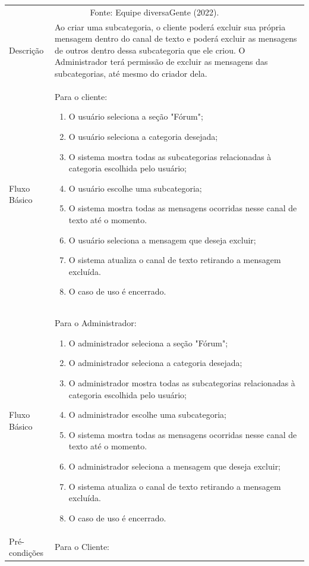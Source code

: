 \begin{landscape}
	\begin{longtable}{|p{3.3cm}|p{10.3cm}|}
		\hline
		\thead{} & \thead{Ator} \\
		\hline
				\endfirsthead
		\multicolumn{2}{c}{\scriptsize Fonte: Equipe diversaGente (2022).}%
		{{\bfseries Quadro \autoref{item}\ continued from previous page}} \\
		\endhead
		Descrição & Ao criar uma subcategoria, o cliente poderá excluir sua própria mensagem dentro do canal de texto e poderá excluir as mensagens de outros dentro dessa subcategoria que ele criou. O Administrador terá permissão de excluir as mensagens das subcategorias, até mesmo do criador dela.\\
		\hline
		Fluxo Básico  & 
		Para o cliente:
		\begin{enumerate}
			\item O usuário seleciona a seção "Fórum";
			\item O usuário seleciona a categoria desejada;
			\item O sistema mostra todas as subcategorias relacionadas à categoria escolhida pelo usuário;
			\item O usuário escolhe uma subcategoria;
			\item O sistema mostra todas as mensagens ocorridas nesse canal de texto até o momento. 
			\item O usuário seleciona a mensagem que deseja excluir;
			\item O sistema atualiza o canal de texto retirando a mensagem excluída. 
			\item O  caso de uso é encerrado. 
		\end{enumerate}\\
		\hline
		Fluxo Básico  & 
		Para o Administrador:
		\begin{enumerate}
			\item O administrador seleciona a seção "Fórum";
			\item O administrador seleciona a categoria desejada;
			\item O administrador mostra todas as subcategorias relacionadas à categoria escolhida pelo usuário;
			\item O administrador escolhe uma subcategoria;
			\item O sistema mostra todas as mensagens ocorridas nesse canal de texto até o momento. 
			\item O administrador seleciona a mensagem que deseja excluir;
			\item O sistema atualiza o canal de texto retirando a mensagem excluída. 
			\item O caso de uso é encerrado. 
		\end{enumerate}\\
		\hline
		Pré-condições & Para o Cliente: 
		

\end{longtable}
\end{landscape}

